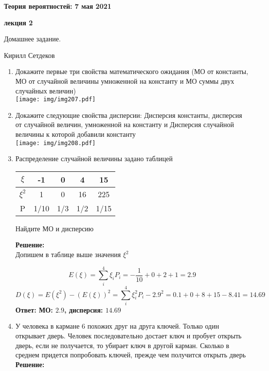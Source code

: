 \documentclass[a4paper,12pt]{article}
\newcounter{z}
\renewcommand{\date}{{\bf 7 мая 2021}}
\newcommand{\HSEhat}{
\vspace*{-0pt}
\noindent
\setcounter{z}{0}


{\bf \phantom{\date}  \large \hfill Теория вероятностей: \hfill \normalsize \date}

\vspace{5 pt}
{\bf \large \hfill  лекция 2\hfill }

\vspace{15 pt}
\centerline{ \large  Домашнее задание.}
\centerline{ \large  Кирилл Сетдеков}



\vspace*{10pt}
\setcounter{z}{0}

}
\begin{document}
\HSEhat


\begin{enumerate}

\subsection*{Задачи:}



\item Докажите первые три свойства математического ожидания (МО от константы, МО от случайной величины умноженной на константу и МО суммы двух случайных величин)\\
\texttt{[image: img/img207.pdf]}

\item Докажите следующие свойства дисперсии: Дисперсия константы, дисперсия от случайной величин, умноженной на константу и Дисперсия случайной величины к которой добавили константу\\
\texttt{[image: img/img208.pdf]}
\item Распределение случайной величины задано таблицей


\begin{center}
 \begin{tabular}{|c| c| c| c|c|} 
 \hline
 $\xi$ & -1 & 0 & 4 & 15 \\ 
  \hline
 $\xi^2$ & 1 & 0 & 16 & 225 \\ 
 \hline
 P & 1/10 & 1/3 & 1/2 & 1/15 \\ 
 \hline
\end{tabular}
\end{center}
Найдите МО и дисперсию

\textbf{Решение:}\\
Допишем в таблице выше значения $\xi^2$

$$E(\xi)=\sum_i^{4} {\xi_i P_i} = -\frac{1}{10}+0+2+1=2.9$$
$$D(\xi)=E(\xi^2) - (E(\xi))^2=\sum_i^{4} {\xi^2_i P_i}-2.9^2 = 0.1+0+8+15-8.41=14.69$$
\textbf{Ответ: МО: $2.9$, дисперсия: $14.69$}


\item У человека в кармане 6 похожих друг на друга ключей. Только один открывает дверь. Человек последовательно достает ключ и пробует открыть дверь, если не получается, то убирает ключ в другой карман. Сколько в среднем придется попробовать ключей, прежде чем получится открыть дверь\\
\textbf{Решение:}\\


\end{enumerate}
\end{document}
